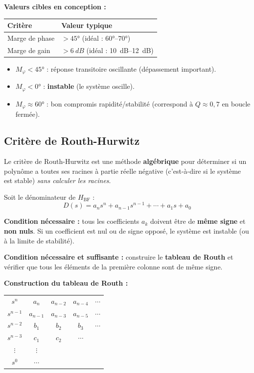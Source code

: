 \documentclass[12pt,a4paper,twoside]{book}
\begin{document}
\begin{pratique}
\textbf{Valeurs cibles en conception :}
\begin{center}
\begin{tabular}{ll}
\toprule
\textbf{Critère} & \textbf{Valeur typique} \\
\midrule
Marge de phase & $> 45°$ (idéal : $60°$--$70°$) \\
Marge de gain & $> \SI{6}{dB}$ (idéal : \SI{10}{dB}--\SI{12}{dB}) \\
\bottomrule
\end{tabular}
\end{center}

\begin{itemize}[nosep]
\item $M_\varphi < 45°$ : réponse transitoire oscillante (dépassement important).
\item $M_\varphi < 0°$ : \textbf{instable} (le système oscille).
\item $M_\varphi \approx 60°$ : bon compromis rapidité/stabilité (correspond à $Q \approx 0{,}7$ en boucle fermée).
\end{itemize}
\end{pratique}

\subsection{Critère de Routh-Hurwitz}

Le critère de Routh-Hurwitz est une méthode \textbf{algébrique} pour déterminer si un polynôme a toutes ses racines à partie réelle négative (c'est-à-dire si le système est stable) \textit{sans calculer les racines}.

Soit le dénominateur de $H_{\text{BF}}$ :
\[
D(s) = a_n s^n + a_{n-1} s^{n-1} + \cdots + a_1 s + a_0
\]

\begin{formule}
\textbf{Condition nécessaire :} tous les coefficients $a_k$ doivent être de \textbf{même signe} et \textbf{non nuls}. Si un coefficient est nul ou de signe opposé, le système est instable (ou à la limite de stabilité).

\textbf{Condition nécessaire et suffisante :} construire le \textbf{tableau de Routh} et vérifier que tous les éléments de la première colonne sont de même signe.
\end{formule}

\textbf{Construction du tableau de Routh :}

\begin{center}
\renewcommand{\arraystretch}{1.4}
\begin{tabular}{c|cccc}
$s^n$ & $a_n$ & $a_{n-2}$ & $a_{n-4}$ & $\cdots$ \\
$s^{n-1}$ & $a_{n-1}$ & $a_{n-3}$ & $a_{n-5}$ & $\cdots$ \\
$s^{n-2}$ & $b_1$ & $b_2$ & $b_3$ & $\cdots$ \\
$s^{n-3}$ & $c_1$ & $c_2$ & $\cdots$ & \\
$\vdots$ & $\vdots$ & & & \\
$s^0$ & $\cdots$ & & & \\
\end{tabular}
\end{center}
\end{document}
